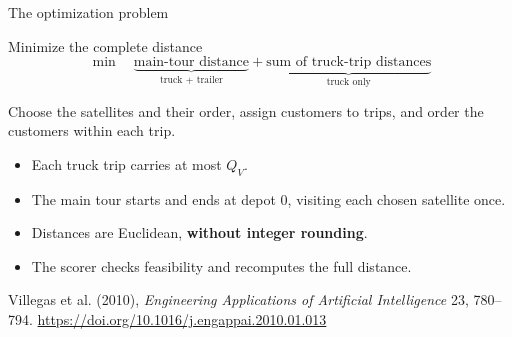\documentclass[table]{customIMTbeamer/imt_pres}
\begin{document}
\begin{frame}{The optimization problem}
\begin{block}{Minimize the complete distance}
\[
\min\quad \underbrace{\text{main-tour distance}}_{\text{truck + trailer}}
+\underbrace{\text{sum of truck-trip distances}}_{\text{truck only}}
\]
\end{block}
Choose the satellites and their order, assign customers to trips, and order the customers within each trip.
\begin{itemize}
\item Each truck trip carries at most $Q_V$.
\item The main tour starts and ends at depot 0, visiting each chosen satellite once.
\item Distances are Euclidean, \textbf{without integer rounding}.
\item The scorer checks feasibility and recomputes the full distance.
\end{itemize}
{\tiny Villegas et al. (2010), \emph{Engineering Applications of Artificial Intelligence} 23, 780--794.\quad
\url{https://doi.org/10.1016/j.engappai.2010.01.013}\par}
\end{frame}
\end{document}
